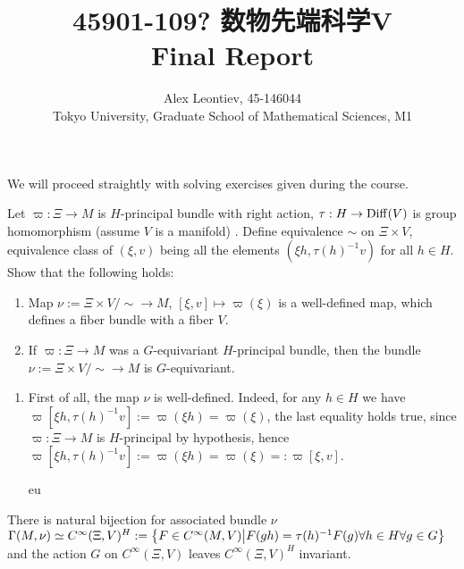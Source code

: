 \documentclass[10pt]{article} %
\title{45901-109? 数物先端科学V\\Final Report}
\author{Alex Leontiev, 45-146044
\\Tokyo University, Graduate School of Mathematical Sciences, M1}
\begin{document}
\begin{CJK}{UTF8}{bsmi}
\maketitle
\end{CJK}
We will proceed straightly with solving exercises given during the course.
\begin{myprob} Let $\varpi:\Xi\to M$ is $H$-principal bundle with right action,
	$\tau:H\to\operatorname{Diff}(V)$ is group homomorphism (assume $V$ is a manifold)
	. Define equivalence $\sim$ on $\Xi\times V$, equivalence class of
	$(\xi,v)$ being all the elements $(\xi h,\tau(h)^{-1}v)$ for all $h\in H$.
	Show that the following holds:
	\begin{enumerate}
		\item Map $\nu:=\Xi\times V/\sim\to M$, $[\xi,v]\mapsto\varpi(\xi)$ is a well-defined map,
			which defines a fiber bundle with a fiber $V$.
		\item If $\varpi:\Xi\to M$ was a $G$-equivariant $H$-principal bundle, then the bundle 
			$\nu:=\Xi\times V/\sim\to M$ is $G$-equivariant.
	\end{enumerate}
\end{myprob}
	\begin{enumerate}
		\item First of all, the map $\nu$ is well-defined. Indeed, for any $h\in H$ we have
			$\varpi[\xi h,\tau(h)^{-1}v]:=\varpi(\xi h)=\varpi(\xi)$, the last equality holds
			true, since $\varpi:\Xi\to M$ is $H$-principal by hypothesis, hence
			$\varpi[\xi h,\tau(h)^{-1}v]:=\varpi(\xi h)=\varpi(\xi)=:\varpi[\xi,v]$.

			eu%
	\end{enumerate}
\begin{myprob} There is natural bijection for associated bundle $\nu$ $\Gamma(M,\nu)\simeq
	C^{\infty}(\Xi,V)^H:=\left\{F\in  C^{\infty}(M,V)\big| F(gh)=\tau(h)^{-1}F(g)\forall h\in H\forall g\in G\right\}$
	and the action $G$ on $C^{\infty}(\Xi,V)$ leaves $C^{\infty}(\Xi,V)^H$ invariant.
\end{myprob}%
\end{document}
